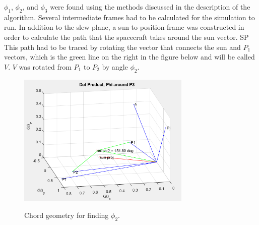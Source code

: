 \documentclass[letterpaper, preprint, paper,11pt]{AAS}	%
\begin{document}
		$\phi_1$, $\phi_2$, and $\phi_3$ were found using the methods discussed in the description of the algorithm. Several intermediate frames had to be calculated for the simulation to run. In addition to the slew plane, a sun-to-position frame was constructed in order to calculate the path that the spacecraft takes around the sun vector. SP This path had to be traced by rotating the vector that connects the sun and $P_1$ vectors, which is the green line on the right in the figure below and will be called $V$. $V$ was rotated from $P_1$ to $P_2$ by angle $\phi_2$. 
		
			\begin{figure}[H]
\begin{center}
				\label{fig:phi2_geometry}
				\includegraphics[width=3.25in]{figures/alphaNot0/chord_geometry_phi2.png}
				\caption{Chord geometry for finding $\phi_2$.}
\end{center}
			\end{figure}
		
\end{document}
